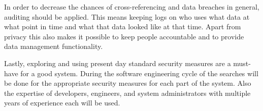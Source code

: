 In order to decrease the chances of cross-referencing and data breaches in general, auditing should be applied.
This means keeping logs on who uses what data at what point in time and what that data looked like at that time.
Apart from privacy this also makes it possible to keep people accountable and to provide data management functionality.

Lastly, exploring and using present day standard security measures are a must-have for a good system.
During the software engineering cycle of the \ivfsystem{} searches will be done for the appropriate security measures for each part of the system.
Also the expertise of developers, engineers, and system administrators with multiple years of experience each will be used.